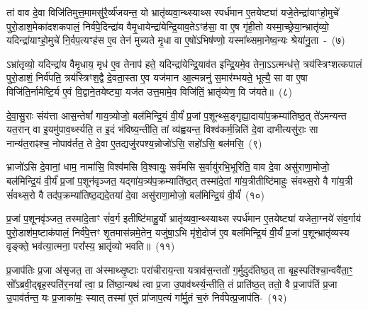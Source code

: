 तां वाव दे॒वा विजि॑तिमुत्त॒मामसु॑रै॒र्व्य॑जयन्त॒ यो भ्रातृ॑व्यवा॒न्थ्स्याथ्स स्पर्ध॑मान ए॒तयेष्ट्या॑ यजे॒तेन्द्रा॑याꣳहो॒मुचे॑ पुरो॒डाश॒मेका॑\-दश\-कपालं॒ निर्व॑पे॒दिन्द्रा॑य वैमृ॒धायेन्द्रा॑येन्द्रि॒याव॒ते\-ऽꣳह॑सा॒ वा ए॒ष गृ॑ही॒तो यस्मा॒च्छ्रेया॒न्भ्रातृ॑व्यो॒ यदिन्द्रा॑याꣳहो॒मुचे॑ नि॒र्वप॒त्यꣳह॑स ए॒व तेन॑ मुच्यते मृ॒धा वा ए॒षो॑\-ऽभिष॑ण्णो॒ यस्मा᳚थ्समा॒नेष्व॒न्यः श्रेया॑नु॒ता~-~(७)\ip

ऽभ्रा॑तृव्यो॒ यदिन्द्रा॑य वैमृ॒धाय॒ मृध॑ ए॒व तेनाप॑ हते॒ यदिन्द्रा॑येन्द्रि॒याव॑त इन्द्रि॒यमे॒व तेना॒\-ऽऽ\-त्मन्ध॑त्ते॒ त्रय॑स्त्रिꣳशत्कपालं पुरो॒डाशं॒ निर्व॑पति॒ त्रय॑स्त्रिꣳश॒द्वै दे॒वता॒स्ता ए॒व यज॑मान आ॒त्मन्ननु॑ स॒मार॑म्भयते॒ भूत्यै॒ सा वा ए॒षा विजि॑ति॒र्नामेष्टि॒र्य ए॒वं वि॒द्वाने॒तयेष्ट्या॒ यज॑त उत्त॒मामे॒व विजि॑तिं॒ भ्रातृ॑व्येण॒ वि ज॑यते॥~(८)\ip

{\anuvakamend[{इ॒न्द्रि॒याव॑ती॒ भूत्या॑ उ॒तैका॒न्नप॑ञ्चा॒शच्च॑}]}

दे॒वा॒सु॒राः संय॑त्ता आस॒न्तेषां᳚ गाय॒त्र्योजो॒ बल॑मिन्द्रि॒यं वी॒र्यं॑ प्र॒जां प॒शून्थ्स॒ङ्गृह्या॒दाया॑प॒\-क्रम्या॑तिष्ठ॒त् ते॑\-ऽमन्यन्त यत॒रान् वा इ॒यमु॑पाव॒र्थ्स्यति॒ त इ॒दं भ॑विष्य॒न्तीति॒ तां व्य॑ह्वयन्त॒ विश्व॑कर्म॒न्निति॑ दे॒वा दाभीत्यसु॑राः॒ सा नान्य॑त॒राꣴश्च॒ नोपाव॑र्तत॒ ते दे॒वा ए॒तद्यजु॑रपश्य॒न्नोजो॑\-ऽसि॒ सहो॑\-ऽसि॒ बल॑मसि॒~(९)\ip

भ्राजो॑\-ऽसि दे॒वानां॒ धाम॒ नामा॑सि॒ विश्व॑मसि वि॒श्वायुः॒ सर्व॑मसि स॒र्वायु॑रभि॒भूरिति॒ वाव दे॒वा असु॑राणा॒मोजो॒ बल॑मिन्द्रि॒यं वी॒र्यं॑ प्र॒जां प॒शून॑वृञ्जत॒ यद्गा॑य॒त्र्य॑प॒क्रम्याति॑ष्ठ॒त् तस्मा॑दे॒तां गा॑य॒त्रीतीष्टि॑माहुः संवथ्स॒रो वै गा॑य॒त्री सं॑वथ्स॒रो वै तद॑प॒क्रम्या॑तिष्ठ॒द्यदे॒तया॑ दे॒वा असु॑राणा॒मोजो॒ बल॑मिन्द्रि॒यं वी॒र्यं॑~(१०)\ip

प्र॒जां प॒शूनवृ॑ञ्जत॒ तस्मा॑दे॒ताꣳ सं॑व॒र्ग इतीष्टि॑माहु॒र्यो भ्रातृ॑व्यवा॒न्थ्स्याथ्स स्पर्ध॑मान ए॒तयेष्ट्या॑ यजेता॒ग्नये॑ संव॒र्गाय॑ पुरो॒डाश॑\-म॒ष्टा\-क॑पालं॒ निर्व॑पे॒त्तꣳ शृ॒तमास॑न्नमे॒तेन॒ यजु॑षा॒\-ऽभि मृ॑शे॒दोज॑ ए॒व बल॑मिन्द्रि॒यं वी॒र्यं॑ प्र॒जां प॒शून्भ्रातृ॑व्यस्य वृङ्क्ते॒ भव॑त्या॒त्मना॒ परा᳚स्य॒ भ्रातृ॑व्यो भवति॥~(११)\ip

{\anuvakamend[{बल॑मस्ये॒तया॑ दे॒वा असु॑राणा॒मोजो॒ बल॑मिन्द्रि॒यं वी॒र्यं॑ पञ्च॑चत्वारिꣳशच्च}]}

प्र॒जा\-प॑तिः प्र॒जा अ॑सृजत॒ ता अ॑स्माथ्सृ॒ष्टाः परा॑चीराय॒न्ता यत्राव॑स॒न्ततो॑ ग॒र्मुदुद॑तिष्ठ॒त् ता बृह॒स्पति॑श्चा॒न्ववै॑ता॒ꣳ॒ सो᳚\-ऽब्रवी॒द्बृह॒स्पति॑र॒नया᳚ त्वा॒ प्र ति॑ष्ठा॒न्यथ॑ त्वा प्र॒जा उ॒पाव॑र्थ्स्य॒न्तीति॒ तं प्राति॑ष्ठ॒त् ततो॒ वै प्र॒जा\-प॑तिं प्र॒जा उ॒पाव॑र्तन्त॒ यः प्र॒जाका॑मः॒ स्यात् तस्मा॑ ए॒तं प्रा॑जाप॒त्यं गा᳚र्मु॒तं च॒रुं निर्व॑पेत्प्र॒जा\-प॑ति-~(१२)\ip

